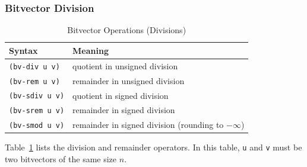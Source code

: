 \documentclass[11pt,twoside,fleqn,openright,titlepage]{cslreport}
\begin{document}
\subsubsection*{Bitvector Division}

\begin{table}
\begin{small}
\begin{center}
\begin{tabular}{|p{3.3cm}|l|}
\hline
Syntax & Meaning \\
\hline
\texttt{(bv-div u v)} & quotient in unsigned division \\
\texttt{(bv-rem u v)} & remainder in unsigned division \\
\hline
\texttt{(bv-sdiv u v)} & quotient in signed division \\
\texttt{(bv-srem u v)} & remainder in signed division \\
\hline
\texttt{(bv-smod u v)} & remainder in signed division (rounding to $-\infty$)\\
\hline
\end{tabular}
\end{center}
\end{small}
\caption{Bitvector Operations (Divisions)}
\label{bitvectors4}
\end{table}

Table~\ref{bitvectors4} lists the division and remainder operators. In
this table, \texttt{u} and \texttt{v} must be two bitvectors of the
same size $n$.
\end{document}
